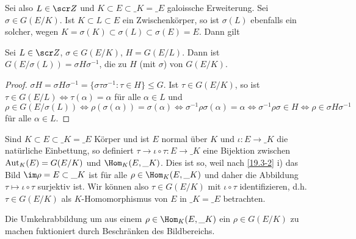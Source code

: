 Sei also $L \in \scr Z$ und $K \subset E \subset \_K = \_E$ galoissche Erweiterung.
Sei $\sigma \in G(E / K)$.
Ist $K \subset L \subset E$ ein Zwischenkörper, so ist $\sigma(L)$ ebenfalls ein solcher, wegen $K = \sigma(K) \subset \sigma(L) \subset \sigma(E) = E$.
Dann gilt

\begin{st} \label{19.4-15}
	Sei $L \in \scr Z$, $\sigma \in G(E / K)$, $H = G(E / L)$.
	Dann ist $G(E / \sigma(L)) = \sigma H \sigma^{-1}$, die zu $H$ (mit $\sigma$)  von $G(E / K)$.
	\begin{proof}
		$\sigma H = \sigma H \sigma^{-1} = \{ \sigma \tau \sigma^{-1} : \tau \in H \} \le G$.
		Ist $\tau \in G(E / K)$, so ist $\tau \in G(E / L) \iff \tau(\alpha) = \alpha$ für alle $\alpha \in L$ und $\rho \in G(E / \sigma(L)) \iff \rho(\sigma(\alpha)) = \sigma(\alpha) \iff \sigma^{-1}\rho\sigma(\alpha) = \alpha \iff \sigma^{-1}\rho\sigma \in H \iff \rho \in \sigma H \sigma^{-1}$ für alle $\alpha \in L$.
	\end{proof}
\end{st}

\begin{nt} \label{19.4-16}
	Sind $K \subset E \subset \_K = \_E$ Körper und ist $E$ normal über $K$ und $\iota: E \to \_K$ die natürliche Einbettung, so definiert $\tau \to \iota \circ \tau : E \to \_K$ eine Bijektion zwischen $\operatorname{Aut}_K(E) = G(E / K)$ und $\Hom_K(E, \_K)$.
	Dies ist so, weil nach \ref{19.3-2} i) das Bild $\im \rho = E \subset \_K$ ist für alle $\rho \in \Hom_K (E, \_K)$ und daher die Abbildung $\tau \mapsto \iota \circ \tau$ surjektiv ist.
	Wir können also $\tau \in G(E / K)$ mit $\iota \circ \tau$ identifizieren, d.h. $\tau \in G(E / K)$ als $K$-Homomorphismus von $E$ in $\_K = \_E$ betrachten.

	Die Umkehrabbildung um aus einem $\rho \in \Hom_K(E, \_K)$ ein $\rho \in G(E / K)$ zu machen fuktioniert durch Beschränken des Bildbereichs.
\end{nt}

